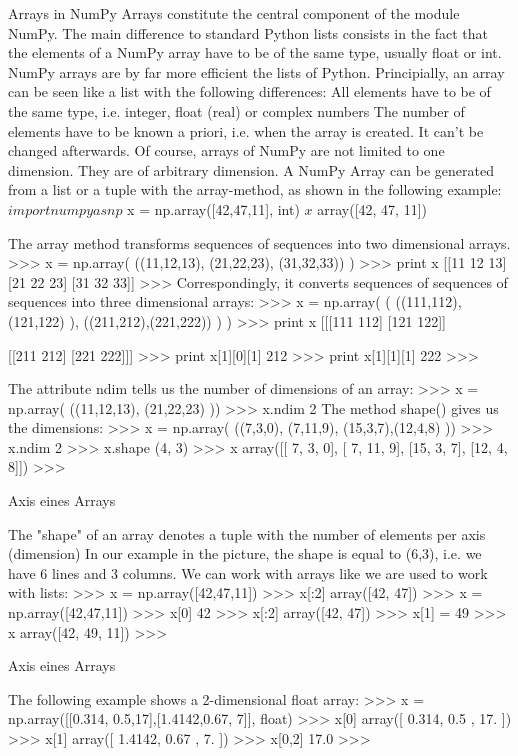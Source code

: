 Arrays in NumPy
Arrays constitute the central component of the module NumPy. 
The main difference to standard Python lists consists in the fact that the elements of a NumPy array have to be of the same type, usually float or int. NumPy arrays are by far more efficient the lists of Python. Principially, an array can be seen like a list with the following differences:
All elements have to be of the same type, i.e. integer, float (real) or complex numbers
The number of elements have to be known a priori, i.e. when the array is created. It can't be changed afterwards.
Of course, arrays of NumPy are not limited to one dimension. They are of arbitrary dimension. 
A NumPy Array can be generated from a list or a tuple with the array-method, as shown in the following example: 
$ import numpy as np
$ x = np.array([42,47,11], int)
$ x
$ array([42, 47, 11])

The array method transforms sequences of sequences into two dimensional arrays.
>>> x = np.array( ((11,12,13), (21,22,23), (31,32,33)) )
>>> print x
[[11 12 13]
 [21 22 23]
 [31 32 33]]
>>> 
Correspondingly, it converts sequences of sequences of sequences into three dimensional arrays:
>>> x = np.array( ( ((111,112), (121,122) ), ((211,212),(221,222)) ) )
>>> print x
[[[111 112]
  [121 122]]

 [[211 212]
  [221 222]]]
>>> print x[1][0][1]
212
>>> print x[1][1][1]
222
>>> 

The attribute ndim tells us the number of dimensions of an array:
>>> x = np.array( ((11,12,13), (21,22,23) ))
>>> x.ndim
2
The method shape() gives us the dimensions:
>>> x = np.array( ((7,3,0), (7,11,9), (15,3,7),(12,4,8)  ))
>>> x.ndim
2
>>> x.shape
(4, 3)
>>> x
array([[ 7,  3,  0],
       [ 7, 11,  9],
       [15,  3,  7],
       [12,  4,  8]])
>>> 

Axis eines Arrays

The "shape" of an array denotes a tuple with the number of elements per axis (dimension) In our example in the picture, the shape is equal to (6,3), i.e. we have 6 lines and 3 columns. 
We can work with arrays like we are used to work with lists: 
>>> x = np.array([42,47,11])
>>> x[:2]
array([42, 47])
>>> x = np.array([42,47,11])
>>> x[0]
42
>>> x[:2]
array([42, 47])
>>> x[1] = 49
>>> x
array([42, 49, 11])
>>>

Axis eines Arrays

The following example shows a 2-dimensional float array:
>>> x = np.array([[0.314, 0.5,17],[1.4142,0.67, 7]], float)
>>> x[0]
array([  0.314,   0.5  ,  17.   ])
>>> x[1]
array([ 1.4142,  0.67  ,  7.    ])
>>> x[0,2]
17.0
>>>

